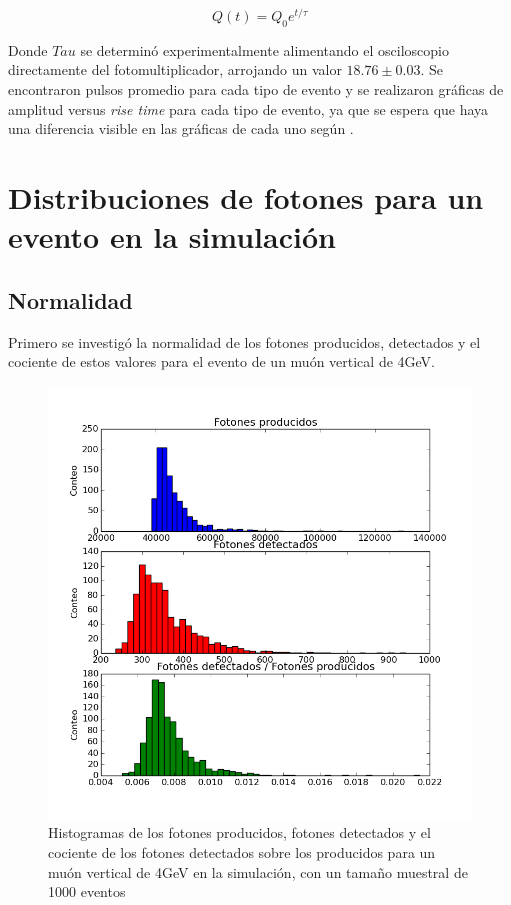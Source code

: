 \documentclass{book}
\begin{document}
\begin{equation}
Q(t)=Q_0e^{t/\tau}
\end{equation}

Donde $Tau$ se determin\'o experimentalmente alimentando el osciloscopio directamente del fotomultiplicador, arrojando un valor $18.76\pm0.03$. Se encontraron pulsos promedio para cada tipo de evento y se realizaron gr\'aficas de amplitud versus \textit{rise time} para cada tipo de evento, ya que se espera que haya una diferencia visible en las gr\'aficas de cada uno seg\'un \citep{}.



\section{Distribuciones de fotones para un evento en la simulaci\'on}

\subsection{Normalidad}

Primero se investig\'o la normalidad de los fotones producidos, detectados y el cociente de estos valores para el evento de un mu\'on vertical de 4GeV.

\begin{figure}[h] %
\begin{center}
 \includegraphics[width=0.8\linewidth]{FotonesMuonVerticalG4.png}
\caption{Histogramas de los fotones producidos, fotones detectados y el cociente de los fotones detectados sobre los producidos para un mu\'on vertical de 4GeV en la simulaci\'on, con un tama\~no muestral de 1000 eventos}
\end{center}
\end{figure}
\end{document}

